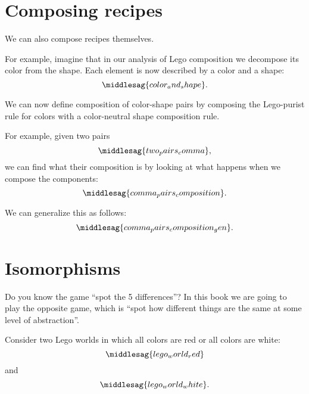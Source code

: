 %

\section{Composing recipes}

We can also compose recipes themselves.

For example, imagine that in our analysis of Lego composition we decompose its color from the shape.
Each element is now described by a color and a shape:
%
\begin{equation}
	\label{eq:color-and-shape}
	\middlesag{color_and_shape}.
\end{equation}

We can now define composition of color-shape pairs by composing the Lego-purist rule for colors with a color-neutral shape composition rule.

For example, given two pairs
%
\begin{equation}
	\label{eq:two_pairs_comma}
	\middlesag{two_pairs_comma},
\end{equation}
%
we can find what their composition is by looking at what happens when we compose the components:
%
\begin{equation}
	\label{eq:comma_pairs_composition}
	\middlesag{comma_pairs_composition}.
\end{equation}

We can generalize this as follows:
\begin{equation}
	\label{eq:comma_pairs_composition_gen}
	\middlesag{comma_pairs_composition_gen}.
\end{equation}

\section{Isomorphisms}

Do you know the game ``spot the 5 differences''?
In this book we are going to play the opposite game, which is ``spot how different things are the same at some level of abstraction''.

Consider two Lego worlds in which all colors are red or all colors are white:
\begin{equation}
	\label{eq:lego_world_red}
	\middlesag{lego_world_red}
\end{equation}
%
and
%
\begin{equation}
	\label{eq:lego_world_white}
	\middlesag{lego_world_white}.
\end{equation}

